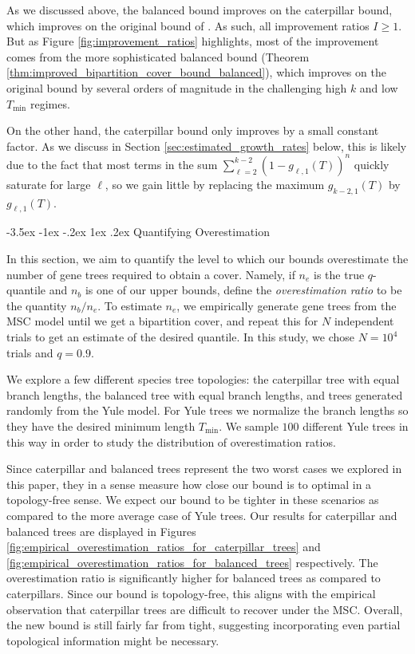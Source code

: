 \documentclass[10pt,oneside,reqno]{article}
\makeatletter
\theoremstyle{plain}
\theoremstyle{definition}
\numberwithin{equation}{section}
\def\subsection#1{\@startsection {subsection}{2}{0pt}%
{-3.5ex \@plus -1ex \@minus -.2ex}%
{1ex \@plus.2ex}%
{\bf\mathversion{bold}}{#1}}
\renewcommand{\geq}{\geqslant}
\makeatother
\begin{document}
As we discussed above, the balanced bound improves on the caterpillar bound, which improves on the original bound of \citet{uricchio2016_bipartition_cover}. As such, all improvement ratios $I \geq 1$. But as Figure \ref{fig:improvement_ratios} highlights, most of the improvement comes from the more sophisticated balanced bound (Theorem \ref{thm:improved_bipartition_cover_bound_balanced}), which improves on the original bound by several orders of magnitude in the challenging high $k$ and low $T_{\mathrm{min}}$ regimes. 

On the other hand, the caterpillar bound only improves by a small constant factor. As we discuss in Section \ref{sec:estimated_growth_rates} below, this is likely due to the fact that most terms in the sum $\sum_{\ell=2}^{k-2} (1-g_{\ell,1}(T))^n$ quickly saturate for large $\ell$, so we gain little by replacing the maximum $g_{k-2,1}(T)$ by $g_{\ell, 1}(T)$.


\subsection{Quantifying Overestimation}
\label{sec:quantifying-overestimation}

In this section, we aim to quantify the level to which our bounds overestimate the number of gene trees required to obtain a cover. Namely, if $n_e$ is the true $q$-quantile and $n_b$ is one of our upper bounds, define the \textit{overestimation ratio} to be the quantity $n_b/n_e$. To estimate $n_e$, we empirically generate gene trees from the MSC model until we get a bipartition cover, and repeat this for $N$ independent trials to get an estimate of the desired quantile. In this study, we chose $N = 10^4$ trials and $q = 0.9$.

We explore a few different species tree topologies: the caterpillar tree with equal branch lengths, the balanced tree with equal branch lengths, and trees generated randomly from the Yule model. For Yule trees we normalize the branch lengths so they have the desired minimum length $T_{\mathrm{min}}$. We sample $100$ different Yule trees in this way in order to study the distribution of overestimation ratios. 

Since caterpillar and balanced trees represent the two worst cases we explored in this paper, they in a sense measure how close our bound is to optimal in a topology-free sense. We expect our bound to be tighter in these scenarios as compared to the more average case of Yule trees. Our results for caterpillar and balanced trees are displayed in Figures \ref{fig:empirical_overestimation_ratios_for_caterpillar_trees} and \ref{fig:empirical_overestimation_ratios_for_balanced_trees} respectively. The overestimation ratio is significantly higher for balanced trees as compared to caterpillars. Since our bound is topology-free, this aligns with the empirical observation that caterpillar trees are difficult to recover under the MSC. Overall, the new bound is still fairly far from tight, suggesting incorporating even partial topological information might be necessary.
\end{document}
